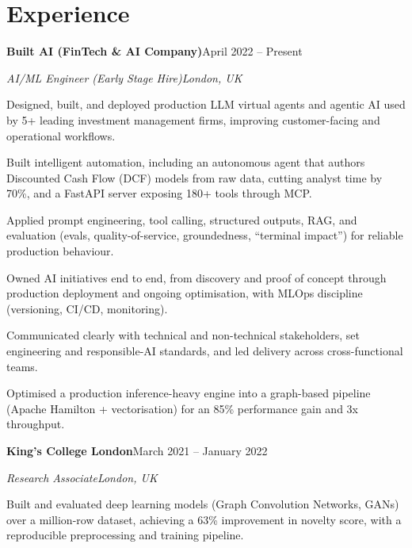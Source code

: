 \documentclass[10pt,a4paper]{article}
\newcommand{\entry}[4]{%
  {\color{company}\bfseries #1}\hfill {\color{muted}#2}\par
  \vspace{1pt}
  {\itshape #3}\hfill {\color{muted}\itshape #4}\par
  \vspace{3pt}%
}
\begin{document}
\section{Experience}
\entry{Built AI (FinTech \& AI Company)}{April 2022 -- Present}{AI/ML Engineer (Early Stage Hire)}{London, UK}
\begin{tight}
  \item Designed, built, and deployed production LLM virtual agents and agentic AI used by 5+ leading investment management firms, improving customer-facing and operational workflows.
  \item Built intelligent automation, including an autonomous agent that authors Discounted Cash Flow (DCF) models from raw data, cutting analyst time by 70\%, and a FastAPI server exposing 180+ tools through MCP.
  \item Applied prompt engineering, tool calling, structured outputs, RAG, and evaluation (evals, quality-of-service, groundedness, ``terminal impact'') for reliable production behaviour.
  \item Owned AI initiatives end to end, from discovery and proof of concept through production deployment and ongoing optimisation, with MLOps discipline (versioning, CI/CD, monitoring).
  \item Communicated clearly with technical and non-technical stakeholders, set engineering and responsible-AI standards, and led delivery across cross-functional teams.
  \item Optimised a production inference-heavy engine into a graph-based pipeline (Apache Hamilton + vectorisation) for an 85\% performance gain and 3x throughput.
\end{tight}

\entry{King's College London}{March 2021 -- January 2022}{Research Associate}{London, UK}
\begin{tight}
  \item Built and evaluated deep learning models (Graph Convolution Networks, GANs) over a million-row dataset, achieving a 63\% improvement in novelty score, with a reproducible preprocessing and training pipeline.
\end{tight}

\end{document}
